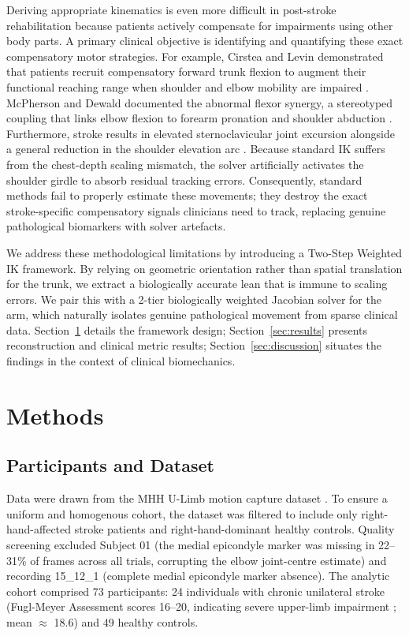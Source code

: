 \documentclass[12pt, a4paper]{elsarticle}
\begin{document}
Deriving appropriate kinematics is even more difficult in post-stroke rehabilitation because patients actively compensate for impairments using other body parts. A primary clinical objective is identifying and quantifying these exact compensatory motor strategies. For example, Cirstea and Levin demonstrated that patients recruit compensatory forward trunk flexion to augment their functional reaching range when shoulder and elbow mobility are impaired \cite{cirstea2000, jayasinghe2021}. McPherson and Dewald documented the abnormal flexor synergy, a stereotyped coupling that links elbow flexion to forearm pronation and shoulder abduction \cite{mcpherson2022}. Furthermore, stroke results in elevated sternoclavicular joint excursion \cite{mccrea2005, michaelsen2001} alongside a general reduction in the shoulder elevation arc \cite{choi2023}. Because standard IK suffers from the chest-depth scaling mismatch, the solver artificially activates the shoulder girdle to absorb residual tracking errors. Consequently, standard methods fail to properly estimate these movements; they destroy the exact stroke-specific compensatory signals clinicians need to track, replacing genuine pathological biomarkers with solver artefacts.

We address these methodological limitations by introducing a Two-Step Weighted IK framework. By relying on geometric orientation rather than spatial translation for the trunk, we extract a biologically accurate lean that is immune to scaling errors. We pair this with a 2-tier biologically weighted Jacobian solver for the arm, which naturally isolates genuine pathological movement from sparse clinical data. Section~\ref{sec:methods} details the framework design; Section~\ref{sec:results} presents reconstruction and clinical metric results; Section~\ref{sec:discussion} situates the findings in the context of clinical biomechanics.

\section{Methods}
\label{sec:methods}

\subsection{Participants and Dataset}
Data were drawn from the MHH U-Limb motion capture dataset \cite{averta2021ulimb}. To ensure a uniform and homogenous cohort, the dataset was filtered to include only right-hand-affected stroke patients and right-hand-dominant healthy controls. Quality screening excluded Subject 01 (the medial epicondyle marker was missing in 22–31\% of frames across all trials, corrupting the elbow joint-centre estimate) and recording 15\_12\_1 (complete medial epicondyle marker absence). The analytic cohort comprised 73 participants: 24 individuals with chronic unilateral stroke (Fugl-Meyer Assessment scores 16–20, indicating severe upper-limb impairment \cite{woodbury2013}; mean $\approx$ 18.6) and 49 healthy controls.
\end{document}
